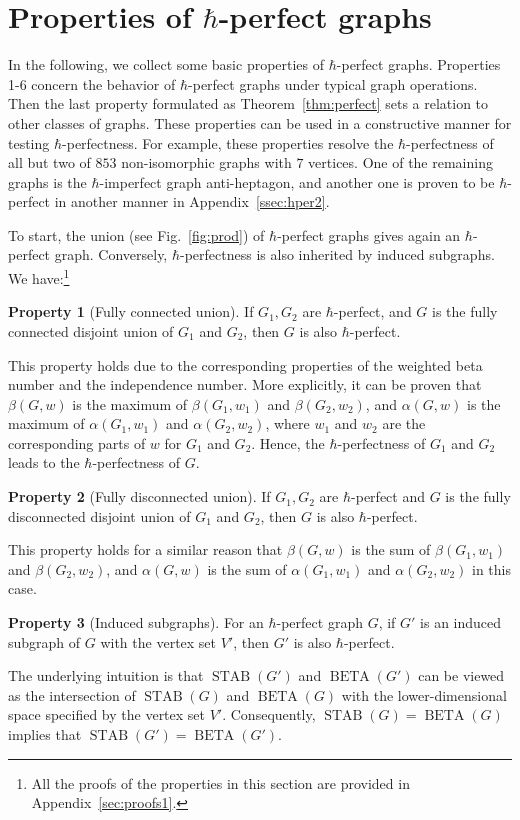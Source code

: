 \documentclass[
12pt,
prx,
aps,
reprint,
a4paper,
longbibliograph,
nofootinbib,
nobibnotes,
superscriptaddress
]{revtex4-2}
\theoremstyle{definition}
\newtheorem{prop}{Property}
\def\stab{\operatorname{STAB}}
\def\be{\operatorname{BETA}}
\begin{document}
\section{\texorpdfstring{Properties of $\mathbf{\hbar}$-perfect graphs}{}}
\label{sec:props}
In the following, we collect some basic properties of $\hbar$-perfect graphs. 
Properties 1-6 concern the behavior of $\hbar$-perfect graphs under typical graph operations. Then the last property formulated as Theorem~\ref{thm:perfect} sets a relation to other classes of graphs. These properties can be used in a constructive manner for testing $\hbar$-perfectness. For example, these properties resolve the $\hbar$-perfectness of all but two of $853$ non-isomorphic graphs with $7$ vertices. One of the remaining graphs is the $\hbar$-imperfect graph anti-heptagon, and another one is proven to be $\hbar$-perfect in another manner in Appendix~\ref{ssec:hper2}.

To start, the union (see Fig.~\ref{fig:prod}) 
of $\hbar$-perfect graphs gives again an $\hbar$-perfect graph. Conversely, $\hbar$-perfectness is also inherited by induced subgraphs. We have:\footnote{All the proofs of the properties in this section are provided in Appendix~\ref{sec:proofs1}.}
\begin{prop}[Fully connected union]
\label{thm:connected_union}
    If $G_1, G_2$ are $\hbar$-perfect, and $G$ is the fully connected disjoint union of $G_1$ and $G_2$, then $G$ is also $\hbar$-perfect.
\end{prop}
This property holds due to the corresponding properties of the weighted beta number and the independence number.
More explicitly, it can be proven that $\beta(G,w)$ is the maximum of $\beta(G_1,w_1)$ and $\beta(G_2,w_2)$, and $\alpha(G,w)$ is the maximum of $\alpha(G_1,w_1)$ and $\alpha(G_2,w_2)$, where $w_1$ and $w_2$ are the corresponding parts of $w$ for $G_1$ and $G_2$.
Hence, the $\hbar$-perfectness of $G_1$ and $G_2$ leads to the $\hbar$-perfectness of $G$.
\begin{prop}[Fully disconnected union]
\label{thm:disconnected_union}
    If $G_1, G_2$ are $\hbar$-perfect and $G$ is the fully disconnected disjoint union of $G_1$ and $G_2$, then $G$ is also $\hbar$-perfect.
\end{prop}
This property holds for a similar reason that $\beta(G,w)$ is the sum of $\beta(G_1,w_1)$ and $\beta(G_2,w_2)$, and $\alpha(G,w)$ is the sum of $\alpha(G_1,w_1)$ and $\alpha(G_2,w_2)$ in this case.
\begin{prop}[Induced subgraphs]
\label{thm:subgraph}
    For an $\hbar$-perfect graph $G$, if $G'$ is an induced subgraph of $G$ with the vertex set $V'$, then $G'$ is also $\hbar$-perfect.
\end{prop}
The underlying intuition is that $\stab(G')$ and $\be(G')$ can be viewed as the 
intersection of $\stab(G)$ and $\be(G)$ 
with the lower-dimensional space specified by the vertex set $V'$. Consequently, $\stab(G)=\be(G)$ implies that $\stab(G')=\be(G')$.
\end{document}
